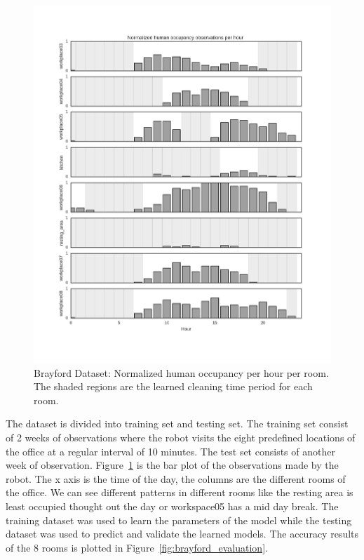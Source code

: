 \begin{figure}[htp]
\centering
\includegraphics[width=\textwidth]{images/occupancy_hist_withresults.png}
\caption[Brayford Dataset ]{Brayford Dataset: Normalized human occupancy per hour per room. The shaded regions are the learned cleaning time period for each room.}
\label{fig:brayford_visualization}
\end{figure}

\FloatBarrier



The dataset is divided into training set and testing set. The training set consist of 2 weeks of observations where the robot visits the eight predefined locations of the office at a regular interval of 10 minutes. The test set consists of another week of observation. Figure~\ref{fig:brayford_visualization} is the bar plot of the observations made by the robot. The x axis is the time of the day, the columns are the different rooms of the office. We can see different patterns in different rooms like the resting area is least occupied thought out the day or workspace05 has a mid day break.
The training dataset was used to learn the parameters of the model while the testing dataset was used to predict and validate the learned models.
The accuracy results of the 8 rooms is plotted in Figure~\ref{fig:brayford_evaluation}. 

